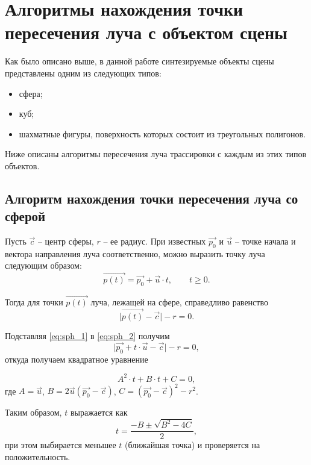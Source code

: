 \section{Алгоритмы нахождения точки пересечения луча с объектом сцены}
Как было описано выше, в данной работе синтезируемые объекты сцены представлены одним из следующих типов:
\begin{itemize}
	\item сфера;
	\item куб;
	\item шахматные фигуры, поверхность которых состоит из треугольных полигонов.
\end{itemize}
Ниже описаны алгоритмы пересечения луча трассировки с каждым из этих типов объектов.

\subsection{Алгоритм нахождения точки пересечения луча со сферой}
Пусть $\vec{c}$ -- центр сферы, $r$ -- ее радиус. При известных $\vec{p_0}$ и $\vec{u}$ -- точке начала и вектора направления луча соответственно, можно выразить точку луча следующим образом:
\begin{equation}\label{eq:sph_1}
	\vec{p(t)} = \vec{p_0} + \vec{u} \cdot t, \qquad t \ge 0.
\end{equation}

Тогда для точки $\vec{p(t)}$ луча, лежащей на сфере, справедливо равенство
\begin{equation}\label{eq:sph_2}
	\lvert\vec{p(t)}-\vec{c}\rvert - r = 0.
\end{equation}

Подставляя \ref{eq:sph_1} в \ref{eq:sph_2} получим
\begin{equation}
	\lvert\vec{p_0} + t\cdot\vec{u} - \vec{c}\rvert - r = 0,
\end{equation} откуда получаем квадратное уравнение

\begin{equation}
	A^2\cdot t + B\cdot t + C = 0,
\end{equation}
где $A = \vec{u}$, $B = 2\vec{u}(\vec{p_0} - \vec{c})$, $C = (\vec{p_0} - \vec{c})^2 - r^2$.

Таким образом, $t$ выражается как 
\begin{equation}
	t = \frac{-B \pm \sqrt{B^2-4C}}{2}, 
\end{equation}
при этом выбирается меньшее $t$ (ближайшая точка) и проверяется на положительность.

